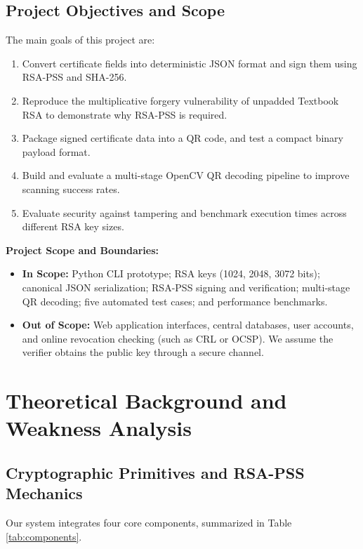 \documentclass[10pt,a4paper]{article}
\begin{document}
\subsection{Project Objectives and Scope}
The main goals of this project are:
\begin{enumerate}
    \setlength{\itemsep}{0pt}
    \setlength{\parskip}{0pt}
    \item Convert certificate fields into deterministic JSON format and sign them using RSA-PSS and SHA-256.
    \item Reproduce the multiplicative forgery vulnerability of unpadded Textbook RSA to demonstrate why RSA-PSS is required.
    \item Package signed certificate data into a QR code, and test a compact binary payload format.
    \item Build and evaluate a multi-stage OpenCV QR decoding pipeline to improve scanning success rates.
    \item Evaluate security against tampering and benchmark execution times across different RSA key sizes.
\end{enumerate}

\noindent \textbf{Project Scope and Boundaries:}
\begin{itemize}
    \setlength{\itemsep}{0pt}
    \setlength{\parskip}{0pt}
    \item \textbf{In Scope:} Python CLI prototype; RSA keys (1024, 2048, 3072 bits); canonical JSON serialization; RSA-PSS signing and verification; multi-stage QR decoding; five automated test cases; and performance benchmarks.
    \item \textbf{Out of Scope:} Web application interfaces, central databases, user accounts, and online revocation checking (such as CRL or OCSP). We assume the verifier obtains the public key through a secure channel.
\end{itemize}

\section{Theoretical Background and Weakness Analysis}

\subsection{Cryptographic Primitives and RSA-PSS Mechanics}
Our system integrates four core components, summarized in Table \ref{tab:components}.
\end{document}
